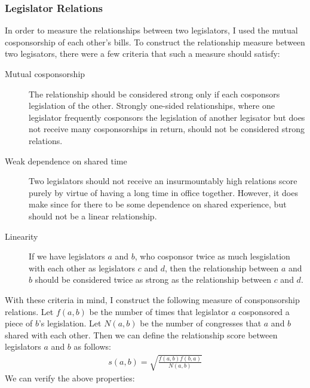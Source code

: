 \documentclass{article}
\begin{document}
\subsubsection{Legislator Relations}
In order to measure the relationships between two legislators, I used the mutual cosponsorship of each other's bills. To construct the relationship measure between two legisators, there were a few criteria that such a measure should satisfy:
\begin{description}
    \item[Mutual cosponsorship] The relationship should be considered strong only if each cosponsors legislation of the other. Strongly one-sided relationships, where one legislator frequently cosponsors the legislation of another legisator but does not receive many cosponsorships in return, should not be considered strong relations. 
    \item[Weak dependence on shared time] Two legislators should not receive an insurmountably high relations score purely by virtue of having a long time in office together. However, it does make since for there to be some dependence on shared experience, but should not be a linear relationship.
    \item[Linearity] If we have legislators $a$ and $b$, who cosponsor twice as much lesgislation with each other as legislators $c$ and $d$, then the relationship between $a$ and $b$ should be considered twice as strong as the relationship between $c$ and $d$. 
\end{description}
With these criteria in mind, I construct the following measure of consponsorship relations. Let $f(a, b)$ be the number of times that legislator $a$ cosponsored a piece of $b$'s legislation. Let $N(a, b)$ be the number of congresses that $a$ and $b$ shared with each other. Then we can define the relationship score between legislators $a$ and $b$ as follows:
\begin{align*}
    s(a, b) = \sqrt{\frac{f(a, b) f(b, a)}{N(a, b)}}
\end{align*}
We can verify the above properties:
\end{document}
